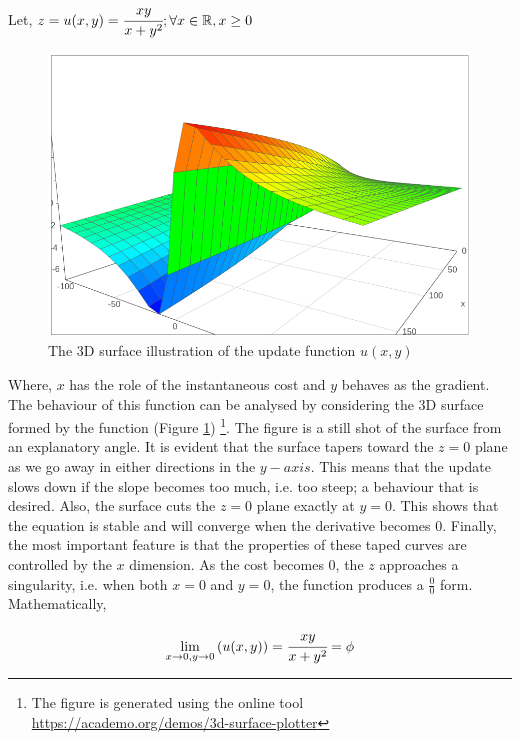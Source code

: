 \documentclass{article}
\begin{document}
\begin{center}
	Let, $z = u(x, y) = \cfrac{xy}{x + y^2}; \forall x \in \mathbb{R}, x \geq 0$
\end{center}

\begin{figure}[ht]
\begin{center}
\includegraphics[scale=1]{diagrams/update_term_surface.png}
\end{center}
\caption{The 3D surface illustration of the update function $u(x, y)$ }
\label{fig:figure_1}
\end{figure}


Where, $x$ has the role of the instantaneous cost and $y$ behaves as the gradient. The behaviour of this function can be analysed by considering the 3D surface formed by the function (Figure \ref{fig:figure_1}) \footnote{The figure is generated using the online tool \\ \url{https://academo.org/demos/3d-surface-plotter}}. The figure is a still shot of the surface from an explanatory angle. It is evident that the surface tapers toward the $z = 0$ plane as we go away in either directions in the $y-axis$. This means that the update slows down if the slope becomes too much, i.e. too steep; a behaviour that is desired. Also, the surface cuts the $z = 0$ plane exactly at $y = 0$. This shows that the equation is stable and will converge when the derivative becomes $0$. Finally, the most important feature is that the properties of these taped curves are controlled by the $x$ dimension. As the cost becomes $0$, the $z$ approaches a singularity, i.e. when both $x = 0$ and $y = 0$, the function produces a $\frac{0}{0}$ form. Mathematically,
\begin{center}
		$$\lim_{x \to 0, y \to 0} \left(u(x, y)\right) = \cfrac{xy}{x + y^2} = \phi$$
\end{center}
\end{document}
